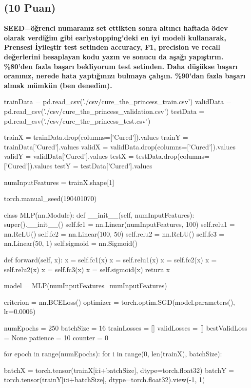 \documentclass[11pt]{article}
\begin{document}
\subsection{(10 Puan)} \textbf{SEED=öğrenci numaranız set ettikten sonra altıncı haftada ödev olarak verdiğim gibi earlystopping'deki en iyi modeli kullanarak, Prensesi İyileştir test setinden accuracy, F1, precision ve recall değerlerini hesaplayan kodu yazın ve sonucu da aşağı yapıştırın. \%80'den fazla başarı bekliyorum test setinden. Daha düşükse başarı oranınız, nerede hata yaptığınızı bulmaya çalışın. \%90'dan fazla başarı almak mümkün (ben denedim).}

\begin{python}
trainData = pd.read_csv('./csv/cure_the_princess_train.csv')
validData = pd.read_csv('./csv/cure_the_princess_validation.csv')
testData =  pd.read_csv('./csv/cure_the_princess_test.csv')

trainX = trainData.drop(columns=['Cured']).values
trainY = trainData['Cured'].values
validX = validData.drop(columns=['Cured']).values
validY = validData['Cured'].values
testX = testData.drop(columns=['Cured']).values
testY = testData['Cured'].values

numInputFeatures = trainX.shape[1]

torch.manual_seed(190401070)

class MLP(nn.Module):
    def __init__(self, numInputFeatures):
        super().__init__()
        self.fc1 = nn.Linear(numInputFeatures, 100) 
        self.relu1 = nn.ReLU() 
        self.fc2 = nn.Linear(100, 50) 
        self.relu2 = nn.ReLU() 
        self.fc3 = nn.Linear(50, 1) 
        self.sigmoid = nn.Sigmoid() 
        
    def forward(self, x):
        x = self.fc1(x)
        x = self.relu1(x)
        x = self.fc2(x)
        x = self.relu2(x)
        x = self.fc3(x)
        x = self.sigmoid(x)
        return x
        
model = MLP(numInputFeatures=numInputFeatures)

criterion = nn.BCELoss()
optimizer = torch.optim.SGD(model.parameters(), lr=0.0006)

numEpochs = 250
batchSize = 16
trainLosses = []
validLosses = []
bestValidLoss = None
patience = 10
counter = 0

for epoch in range(numEpochs):
    for i in range(0, len(trainX), batchSize):
        
        batchX = torch.tensor(trainX[i:i+batchSize], dtype=torch.float32)
        batchY = torch.tensor(trainY[i:i+batchSize], dtype=torch.float32).view(-1, 1)
        

\end{python}
\end{document}
